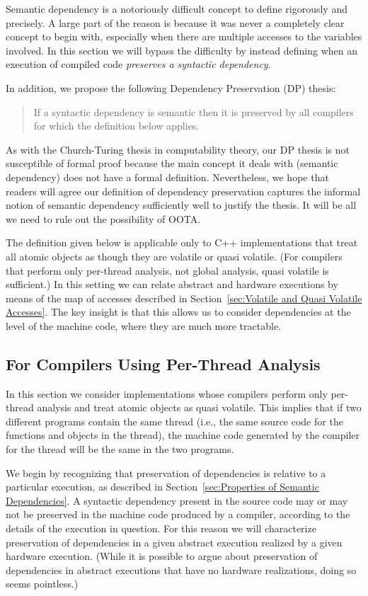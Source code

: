 Semantic dependency is a notoriously difficult concept to define
rigorously and precisely.
A large part of the reason is because it was never a completely clear
concept to begin with, especially when there are multiple accesses to
the variables involved.
In this section we will bypass the difficulty by instead defining
when an execution of compiled code \emph{preserves a syntactic dependency}.

In addition, we propose the following Dependency Preservation (DP) thesis:
\begin{quote}
	If a syntactic dependency is semantic then it is preserved
	by all compilers for which the definition below applies.
\end{quote}
As with the Church-Turing thesis in computability theory,
our DP thesis is not susceptible of formal proof because
the main concept it deals with (semantic dependency)
does not have a formal definition.
Nevertheless, we hope that readers will agree our definition of
dependency preservation captures the informal notion of
semantic dependency sufficiently well to justify the thesis.
It will be all we need to rule out the possibility of OOTA.

The definition given below is applicable only to C++ implementations
that treat all atomic objects as though they are volatile or
quasi volatile.
(For compilers that perform only per-thread analysis, not global
analysis, quasi volatile is sufficient.)
In this setting we can relate abstract and hardware executions by
means of the map of accesses described in
Section~\ref{sec:Volatile and Quasi Volatile Accesses}.
The key insight is that this allows us to consider
dependencies at the level of the machine code, where they are much
more tractable.

\subsection{For Compilers Using Per-Thread Analysis}
\label{sec:For Compilers Using Per-Thread Analysis}

In this section we consider implementations whose compilers perform
only per-thread analysis and treat atomic objects as
quasi volatile.
This implies that if two different programs contain the same thread
(i.e., the same source code for the functions and objects in the thread), the
machine code generated by the compiler for the thread will be the
same in the two programs.

We begin by recognizing that preservation of dependencies is relative to a
particular execution,
as described in Section~\ref{sec:Properties of Semantic Dependencies}.
A syntactic dependency present in the source code may or may not be
preserved in the machine code produced by a compiler,
according to the details of the execution in question.
For this reason we will characterize preservation of dependencies in a given
abstract execution realized by a given hardware execution.
(While it is possible to argue about preservation of dependencies in abstract
executions that have no hardware realizations, doing so seems pointless.)

